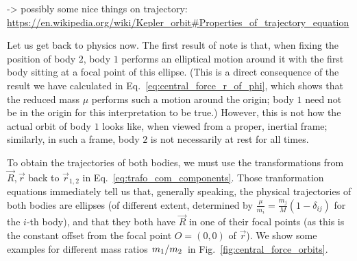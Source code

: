 \documentclass[../class_mech_main.tex]{subfiles}
\begin{document}


-> possibly some nice things on trajectory: \url{https://en.wikipedia.org/wiki/Kepler_orbit#Properties_of_trajectory_equation}



Let us get back to physics now. The first result of note is that, when fixing the position of body $2$, body $1$ performs an elliptical motion around it with the first body sitting at a focal point of this ellipse. (This is a direct consequence of the result we have calculated in Eq.~\eqref{eq:central_force_r_of_phi}, which shows that the reduced mass $\mu$ performs such a motion around the origin; body $1$ need not be in the origin for this interpretation to be true.) However, this is not how the actual orbit of body $1$ looks like, when viewed from a proper, inertial frame; similarly, in such a frame, body $2$ is not necessarily at rest for all times.

To obtain the trajectories of both bodies, we must use the transformations from $\vec{R}, \vec{r}$ back to $\vec{r}_{1, 2}$ in Eq.~\eqref{eq:trafo_com_components}. Those tranformation equations immediately tell us that, generally speaking, the physical trajectories of both bodies are ellipses (of different extent, determined by $\frac{\mu}{m_i} = \frac{m_j}{M} (1 - \delta_{ij})$ for the $i$-th body), and that they both have $\vec{R}$ in one of their focal points (as this is the constant offset from the focal point $O = (0, 0)$ of $\vec{r}$). We show some examples for different mass ratios $\flatfrac{m_1}{m_2}$ in Fig.~\ref{fig:central_force_orbits}.




\end{document}
